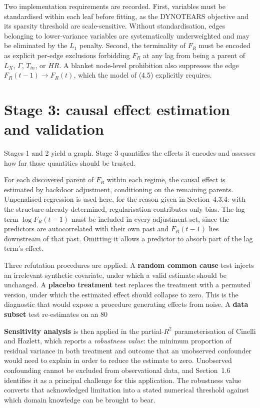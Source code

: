 Two implementation requirements are recorded. First, variables must be standardised
within each leaf before fitting, as the DYNOTEARS objective and its sparsity threshold
are scale-sensitive. Without standardisation, edges belonging to lower-variance
variables are systematically underweighted and may be eliminated by the $L_1$ penalty.
Second, the terminality of $F_R$ must be encoded as explicit per-edge exclusions
forbidding $F_R$ at any lag from being a parent of $L_X$, $\Gamma$, $T_{in}$, or $HR$.
A blanket node-level prohibition also suppresses the edge $F_R(t-1) \to F_R(t)$, which
the model of (4.5) explicitly requires.


\section{Stage 3: causal effect estimation and validation}

Stages 1 and 2 yield a graph. Stage 3 quantifies the effects it encodes and assesses
how far those quantities should be trusted.

For each discovered parent of $F_R$ within each regime, the causal effect is estimated
by backdoor adjustment, conditioning on the remaining parents. Unpenalised regression
is used here, for the reason given in Section~4.3.4: with the structure already determined,
regularisation contributes only bias. The lag term $\log F_R(t-1)$ must be included in
every adjustment set, since the predictors are autocorrelated with their own past and
$F_R(t-1)$ lies downstream of that past. Omitting it allows a predictor to absorb part
of the lag term's effect.

Three refutation procedures are applied. A \textbf{random common cause} test injects an
irrelevant synthetic covariate, under which a valid estimate should be unchanged. A
\textbf{placebo treatment} test replaces the treatment with a permuted version, under which
the estimated effect should collapse to zero. This is the diagnostic that would expose
a procedure generating effects from noise. A \textbf{data subset} test re-estimates on an
80%

\textbf{Sensitivity analysis} is then applied in the partial-$R^2$ parameterisation of
Cinelli and Hazlett, which reports a \textit{robustness value}: the minimum proportion of
residual variance in both treatment and outcome that an unobserved confounder would
need to explain in order to reduce the estimate to zero. Unobserved confounding cannot
be excluded from observational data, and Section~1.6 identifies it as a principal challenge
for this application. The robustness value converts that acknowledged limitation into
a stated numerical threshold against which domain knowledge can be brought to bear.

